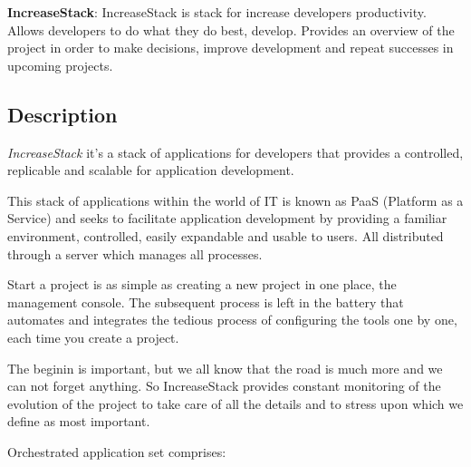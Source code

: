 \documentclass[11pt]{scrartcl}
\begin{document}
\textbf{IncreaseStack}: IncreaseStack is stack for increase developers productivity. Allows developers to do what they do best, develop. Provides an overview of the project in order to make decisions, improve development and repeat successes in upcoming projects.

\subsection{Description}

\emph{IncreaseStack} it's a stack of applications for developers that provides a controlled, replicable and scalable for application development. 

\par This stack of applications within the world of IT is known as PaaS (Platform as a Service) and seeks to facilitate application development by providing a familiar environment, controlled, easily expandable and usable to users. All distributed through a server which manages all processes.

\par Start a project is as simple as creating a new project in one place, the management console. The subsequent process is left in the battery that automates and integrates the tedious process of configuring the tools one by one, each time you create a project.

\par The beginin is important, but we all know that the road is much more and we can not forget anything. So IncreaseStack provides constant monitoring of the evolution of the project to take care of all the details and to stress upon which we define as most important.

\par Orchestrated application set comprises:
\end{document}
